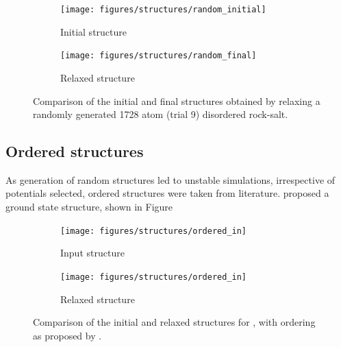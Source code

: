\newpage
\begin{figure}[H]
\centering
 \begin{subfigure}{\textwidth}
 \centering
    \texttt{[image: figures/structures/random\_initial]}
    \caption{Initial structure}
    \label{fig:random_initial}
 \end{subfigure}
  \begin{subfigure}{\textwidth}
   \centering
    \texttt{[image: figures/structures/random\_final]}
    \caption{Relaxed structure}
    \label{fig:random_final}
 \end{subfigure}
\caption{Comparison of the initial and final structures obtained by relaxing a randomly generated 1728 atom (trial 9)  disordered rock-salt.}
\label{fig:random}
\end{figure}

\newpage
\subsection{Ordered structures}
As generation of random structures led to unstable simulations, irrespective of potentials selected, ordered structures were taken from literature.
\citet{Diaz-Lopez2017} proposed a ground state structure, shown in Figure 

\begin{figure}[p]
\centering

\begin{subfigure}{0.5\textwidth}
\centering
\texttt{[image: figures/structures/ordered\_in]}
\caption{Input structure\cite{Diaz-Lopez2017}}
\end{subfigure}%
\begin{subfigure}{0.5\textwidth}
\centering
\texttt{[image: figures/structures/ordered\_in]}
\caption{Relaxed structure}
\end{subfigure}

\caption[Comparison of the initial and relaxed structures for ordered ]{Comparison of the initial and relaxed structures for , with ordering as proposed by \citet{Diaz-Lopez2017}.}
\end{figure}

